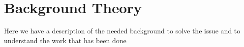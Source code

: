 \chapter{Background Theory}
Here we have a description of the needed background to solve the issue and to understand the work that has
been done